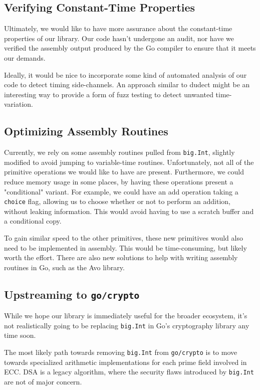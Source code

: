 \documentclass[11pt, a4paper]{article} %
\begin{document}
{\subsection{Verifying Constant-Time Properties}

Ultimately, we would like to have more assurance about the
constant-time properties of our library. Our code hasn't
undergone an audit, nor have we verified the assembly output
produced by the Go compiler to ensure that it meets our demands.

Ideally, it would be nice to incorporate some kind of automated
analysis of our code to detect timing side-channels. An approach
similar to dudect
\cite{reparaz_dude_2017} 
might be an interesting way to provide a form of fuzz testing
to detect unwanted time-variation.

\subsection{Optimizing Assembly Routines}

Currently, we rely on some assembly routines pulled from
\texttt{big.Int}, slightly modified to avoid jumping to variable-time
routines. Unfortunately, not all of the primitive operations we would
like to have are present. Furthermore, we could reduce memory usage
in some places, by having these operations present a "conditional"
variant. For example, we could have an add operation taking a
\texttt{choice} flag, allowing us to choose whether or not to perform
an addition, without leaking information. This would avoid having
to use a scratch buffer and a conditional copy.

To gain similar speed to the other primitives, these new primitives
would also need to be implemented in assembly. This would be time-consuming,
but likely worth the effort. There are also new solutions
to help with writing assembly routines in Go, such as the Avo library.

\subsection{Upstreaming to \texttt{go/crypto}}

While we hope our library is immediately useful for the broader
ecosystem, it's not realistically going to be replacing
\texttt{big.Int} in Go's cryptography library any time soon.

The most likely path towards removing \texttt{big.Int} from
\texttt{go/crypto} is to move towards specialized arithmetic
implementations for each prime field involved in ECC. DSA is a legacy
algorithm, where the security flaws introduced
by \texttt{big.Int} are not of major concern.

}
\end{document}
